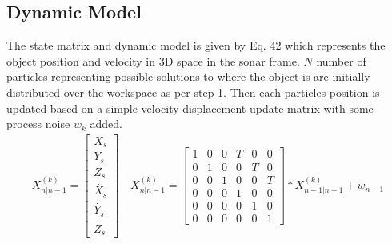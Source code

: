 \documentclass[a4paper]{IEEEtran}
\begin{document}
\subsection{Dynamic Model}

The state matrix and dynamic model is given by Eq. 42 which represents the object position and velocity in 3D space in the sonar frame. $N$ number of particles representing possible solutions to where the object is are initially distributed over the workspace as per step 1. Then each particles position is updated based on a simple velocity displacement update matrix with some process noise $w_{k}$ added.
\begingroup\makeatletter\def\f@size{7}\check@mathfonts
\begin{gather}
X_{n|n-1}^{(k)}=\left[\begin{array}{c}
X_{s}\\
Y_{s}\\
Z_{s}\\
\dot{X_{s}}\\
\dot{Y_{s}}\\
\dot{Z_{s}}
\end{array}\right]\quad X_{n|n-1}^{(k)}=\left[\begin{array}{cccccc}
1 & 0 & 0 & T & 0 & 0\\
0 & 1 & 0 & 0 & T & 0\\
0 & 0 & 1 & 0 & 0 & T\\
0 & 0 & 0 & 1 & 0 & 0\\
0 & 0 & 0 & 0 & 1 & 0\\
0 & 0 & 0 & 0 & 0 & 1
\end{array}\right]*X_{n-1|n-1}^{(k)}+w_{n-1}
\end{gather}
\endgroup 
\end{document}
